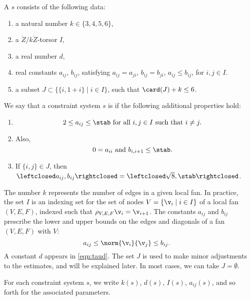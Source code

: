 \begin{definition}
A  $s$ consists of the following data:
\begin{enumerate}
\item a natural number $k\in \{3,4,5,6\}$,
\item a $\ring{Z}/k\ring{Z}$-torsor $I$,
\item a real number $d$,
\item real constants $a_{ij}$, $b_{ij}$,  satisfying
   $a_{ij} = a_{ji}$, $b_{ij}=b_{ji}$, $a_{ij}\le b_{ij}$, for $i,j\in I$.
\item a subset $J\subset \{ \{i,1+i\} \mid i\in I\}$, 
such that $\card(J)+k\le 6$.
\end{enumerate}
%
We say that a constraint system $s$ is  if the following
additional properties hold:
\begin{enumerate}
\item 
\[
2\le a_{ij}\le \stab \text{ for all }  i,j\in I \text{ such that } i\ne j.
\]  
\item
  Also, 
\[0 = a_{ii}\text{ and }
  b_{i,i+1}\le \stab.
\]  
\item
If $\{i,j\}\in J$, then $\leftclosed
  a_{ij},b_{ij}\rightclosed=\leftclosed\sqrt{8},\stab\rightclosed$.
\end{enumerate}
\end{definition}

\begin{remark}
  The number $k$ represents the number of edges in a given local fan.
  In practice, the set $I$ is an indexing set for the set of nodes
  $V=\{\v_i\mid i\in I\}$ of a local fan $(V,E,F)$, indexed such that
$\rho_{V,E,F}\v_i = \v_{i+1}$.   The constants $a_{ij}$ and
  $b_{ij}$ prescribe the lower and upper bounds on the edges and
  diagonals of a fan $(V,E,F)$ with $V$:
\[
a_{ij}\le \norm{\v_i}{\v_j} \le b_{ij}.
\]
A constant $d$ appears in \eqref{eqn:taud}.    The set $J$ is used to
make minor adjustments to the estimates, and will be explained later.
In most cases, we can take $J=\emptyset$.
\end{remark}

For each constraint system $s$, we write $k(s)$,
$d(s)$, $I(s)$, $a_{ij}(s)$, and so forth for the associated
parameters.  

